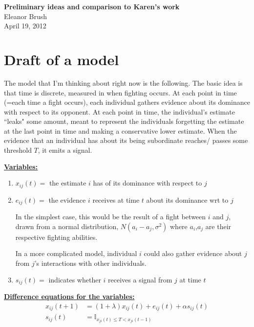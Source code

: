 \documentclass{article}
\begin{document}
\begin{center}
\Large

\end{center}


\vspace{0pt}

\begin{center}
{\bf Preliminary ideas and comparison to Karen's work}
\\ Eleanor Brush
\\ April 19, 2012
\end{center}

\vspace{0pt}
\normalsize
\section{Draft of a model}

The model that I'm thinking about right now is the following.  The basic idea is that time is discrete, measured in when fighting occurs.  At each point in time (=each time a fight occurs), each individual gathers evidence about its dominance with respect to its opponent.  At each point in time, the individual's estimate ``leaks" some amount, meant to represent the individuals forgetting the estimate at the last point in time and making a conservative lower estimate.  When the evidence that an individual has about its being subordinate reaches/ passes some threshold $T$, it emits a signal.


\underline{\bf Variables:}
\begin{enumerate}
\item{$x_{ij}(t)=$ the estimate $i$ has of its dominance with respect to $j$}
\item{$e_{ij}(t)=$ the evidence $i$ receives at time $t$ about its dominance wrt to $j$

In the simplest case, this would be the result of a fight between $i$ and $j$, drawn from a normal distribution, $N(a_i-a_j,\sigma^2)$ where $a_i$,$a_j$ are their respective fighting abilities.  

In a more complicated model, individual $i$ could also gather evidence about $j$ from $j$'s interactions with other individuals.}
\item{$s_{ij}(t)=$ indicates whether $i$ receives a signal from $j$ at time $t$}
\end{enumerate}


\underline{\bf Difference equations for the variables:}
\begin{align*}
x_{ij}(t+1)&=(1+\lambda)x_{ij}(t)+e_{ij}(t)+\alpha s_{ij}(t)
\\ s_{ij}(t)&=\mathbb{I}_{x_{ji}(t)\leq T< x_{ji}(t-1)}
\end{align*}
\end{document}
